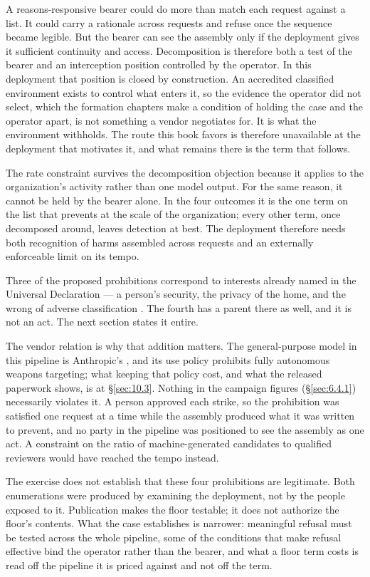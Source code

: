 A reasons-responsive bearer could do more than match each request against a list. It could carry a rationale across requests and refuse once the sequence became legible. But the bearer can see the assembly only if the deployment gives it sufficient continuity and access. Decomposition is therefore both a test of the bearer and an interception position controlled by the operator. In this deployment that position is closed by construction. An accredited classified environment exists to control what enters it, so the evidence the operator did not select, which the formation chapters make a condition of holding the case and
the operator apart, is not something a vendor negotiates for. It is what the environment withholds. The route this book favors is therefore unavailable at the deployment that motivates it, and what remains there is the term that follows.

The rate constraint survives the decomposition objection because it applies to the organization's activity rather than one model output. For the same reason, it cannot be held by the bearer alone. In the four outcomes it is the one term on the list that prevents at the scale of the organization; every other term, once decomposed around, leaves detection at best. The deployment therefore needs both recognition of harms assembled across requests and an externally enforceable limit on its tempo.

Three of the proposed prohibitions correspond to interests already named in the Universal Declaration — a person's security, the privacy of the home, and the wrong of adverse classification \autocite{un1948udhr}. The fourth has a parent there as well, and it is not an act. The next section states it entire.

The vendor relation is why that addition matters. The general-purpose model in this pipeline is Anthropic's \autocite{livingstone2026maven}, and its use policy prohibits fully autonomous weapons targeting; what keeping that policy cost, and what the released paperwork shows, is at §\ref{sec:10.3}. Nothing in the campaign figures (§\ref{sec:6.4.1}) necessarily violates it. A person approved each strike, so the prohibition was satisfied one request at a time while the assembly produced what it was written to prevent, and no party in the pipeline was positioned to see the assembly as one act. A constraint on the ratio of machine-generated candidates to qualified reviewers would have reached the tempo instead.

The exercise does not establish that these four prohibitions are legitimate. Both enumerations were produced by examining the deployment, not by the people exposed to it. Publication makes the floor testable; it does not authorize the floor's contents. What the case establishes is narrower: meaningful refusal must be tested across the whole pipeline, some of the conditions that make refusal effective bind the operator rather than the bearer, and what a floor term costs is read off the pipeline it is priced against and not off the term.
